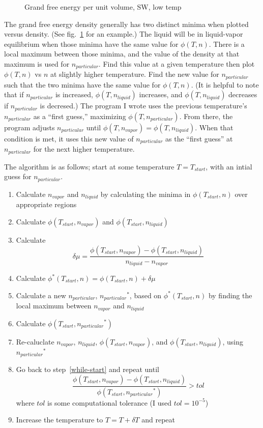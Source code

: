 \documentclass[letterpaper,twocolumn,amsmath,amssymb,prb]{revtex4-1}
\newcommand{\npart}{\ensuremath{n_{particular}}}
\newcommand{\nliq}{\ensuremath{n_{liquid}}}
\newcommand{\nvap}{\ensuremath{n_{vapor}}}
\newcommand{\1}{\ensuremath{\textbf{r}_1}}
\newcommand{\2}{\ensuremath{\textbf{r}_2}}
\newcommand{\3}{\ensuremath{\textbf{r}_3}}
\newcommand{\4}{\ensuremath{\textbf{r}_4}}
\begin{document}
\begin{figure}
  \centering
  \caption{Grand free energy per unit volume, SW, low temp}
  \label{fig:SW-phi-lowT}
\end{figure}

The grand free energy density generally has two distinct minima when
plotted versus density. (See fig.~\ref{fig:SW-phi-lowT} for an
example.) The liquid will be in liquid-vapor equilibrium when those
minima have the same value for $\phi(T,n)$. There is a local maximum
between those minima, and the value of the density at that maximum is
used for $\npart$. Find this value at a given temperature then plot
$\phi(T,n)$ vs $n$ at slightly higher temperature. Find the new value
for $\npart$ such that the two minima have the same value for
$\phi(T,n)$. (It is helpful to note that if $\npart$ is increased,
$\phi(T,\nliq)$ increases, and $\phi(T,\nliq)$ decreases if $\npart$
is decresed.) The program I wrote uses the previous temperature's
$\npart$ as a ``first guess,'' maximizing $\phi(T,\npart)$. From
there, the program adjusts $\npart$ until $\phi(T,\nvap) =
\phi(T,\nliq)$. When that condition is met, it uses this new value of
$\npart$ as the ``first guess'' at $\npart$ for the next higher
temperature.

The algorithm is as follows; start at some temperature $T=T_{start}$,
with an intial guess for $\npart$.
\begin{enumerate}
  \item Calculate $\nvap$ and $\nliq$ by calculating the minima in $\phi(T_{start},n)$ over appropriate regions
  \item Calculate $\phi(T_{start},\nvap)$ and $\phi(T_{start},\nliq)$ \label{while-start}
  \item Calculate \[\delta\mu = \frac{\phi(T_{start},\nvap) - \phi(T_{start},\nliq)}{\nliq - \nvap}\]
  \item Calculate $\phi^*(T_{start},n) = \phi(T_{start},n) + \delta\mu$
  \item Calculate a new $\npart$, $\npart^*$, based on $\phi^*(T_{start},n)$ by finding the local maximum between $\nvap$ and $\nliq$
  \item Calculate $\phi(T_{start},\npart^*)$
  \item Re-caluclate $\nvap$, $\nliq$, $\phi(T_{start},\nvap)$, and $\phi(T_{start},\nliq)$, using $\npart^*$
  \item Go back to step~\ref{while-start} and repeat until \[ \frac{\phi(T_{start},\nvap) - \phi(T_{start},\nliq)}{\phi(T_{start},\npart^*)} > tol  \] where $tol$ is some computational tolerance (I used $tol=10^{-5}$)
  \item Increase the temperature to $T = T + \delta T$ and repeat
\end{enumerate}
\end{document}
